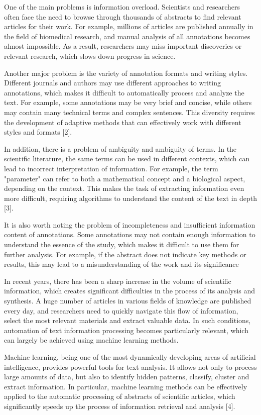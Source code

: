 \documentclass[
]{article}
\begin{document}
One of the main problems is information overload. Scientists and
researchers often face the need to browse through thousands of abstracts
to find relevant articles for their work. For example, millions of
articles are published annually in the field of biomedical research, and
manual analysis of all annotations becomes almost impossible. As a
result, researchers may miss important discoveries or relevant research,
which slows down progress in science.

Another major problem is the variety of annotation formats and writing
styles. Different journals and authors may use different approaches to
writing annotations, which makes it difficult to automatically process
and analyze the text. For example, some annotations may be very brief
and concise, while others may contain many technical terms and complex
sentences. This diversity requires the development of adaptive methods
that can effectively work with different styles and formats {[}2{]}.

In addition, there is a problem of ambiguity and ambiguity of terms. In
the scientific literature, the same terms can be used in different
contexts, which can lead to incorrect interpretation of information. For
example, the term "parameter" can refer to both a mathematical concept
and a biological aspect, depending on the context. This makes the task
of extracting information even more difficult, requiring algorithms to
understand the content of the text in depth {[}3{]}.

It is also worth noting the problem of incompleteness and insufficient
information content of annotations. Some annotations may not contain
enough information to understand the essence of the study, which makes
it difficult to use them for further analysis. For example, if the
abstract does not indicate key methods or results, this may lead to a
misunderstanding of the work and its significance

In recent years, there has been a sharp increase in the volume of
scientific information, which creates significant difficulties in the
process of its analysis and synthesis. A huge number of articles in
various fields of knowledge are published every day, and researchers
need to quickly navigate this flow of information, select the most
relevant materials and extract valuable data. In such conditions,
automation of text information processing becomes particularly relevant,
which can largely be achieved using machine learning methods.

Machine learning, being one of the most dynamically developing areas of
artificial intelligence, provides powerful tools for text analysis. It
allows not only to process large amounts of data, but also to identify
hidden patterns, classify, cluster and extract information. In
particular, machine learning methods can be effectively applied to the
automatic processing of abstracts of scientific articles, which
significantly speeds up the process of information retrieval and
analysis {[}4{]}.
\end{document}
